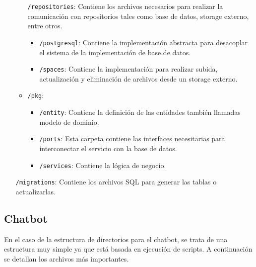 \begin{itemize}
\begin{itemize}
    \texttt{/repositories}: Contiene los archivos necesarios para realizar la comunicación con repositorios tales como base de datos, storage externo, entre otros.
  \begin{itemize}
  \tightlist
  \item 
    \texttt{/postgresql}: Contiene la implementación abstracta para desacoplar el sistema de la implementación de base de datos.
  \item  
    \texttt{/spaces}: Contiene la implementación para realizar subida, actualización y eliminación de archivos desde un storage externo.
    \end{itemize}
          \item  
    \texttt{/pkg}:
\begin{itemize}
  \tightlist
  \item 
    \texttt{/entity}: Contiene la definición de las entidades también llamadas modelo de dominio.
  \item  
    \texttt{/ports}: Esta carpeta contiene las interfaces necesitarias para interconectar el servicio con la base de datos.
  \item  
    \texttt{/services}: Contiene la lógica de negocio.
    \end{itemize}
    \end{itemize}
    \texttt{/migrations}: Contiene los archivos SQL para generar las tablas o actualizarlas.
    \end{itemize}

\subsection{Chatbot}
En el caso de la estructura de directorios para el chatbot, se trata de una estructura muy simple ya que está basada en ejecución de scripts. A continuación se detallan los archivos más importantes.

